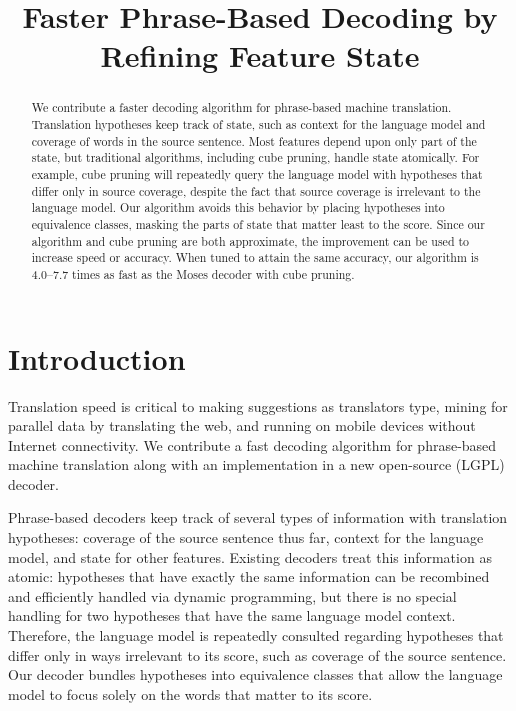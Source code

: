 \documentclass[11pt]{article}
\title{Faster Phrase-Based Decoding by Refining Feature State}
\author{}
\date{}
\begin{document}
\maketitle
\begin{abstract}
We contribute a faster decoding algorithm for phrase-based machine translation.  Translation hypotheses keep track of state, such as context for the language model and coverage of words in the source sentence.  Most features depend upon only part of the state, but traditional algorithms, including cube pruning, handle state atomically.  For example, cube pruning will repeatedly query the language model with hypotheses that differ only in source coverage, despite the fact that source coverage is irrelevant to the language model.  
Our algorithm avoids this behavior by placing hypotheses into equivalence classes, masking the parts of state that matter least to the score.  
Since our algorithm and cube pruning are both approximate, the improvement can be used to increase speed or accuracy.  
When tuned to attain the same accuracy, our algorithm is 4.0--7.7 times as fast as the Moses decoder with cube pruning.  
\end{abstract}

\section{Introduction}
\label{intro_label}
Translation speed is critical to making suggestions as translators type, mining for parallel data by translating the web, and running on mobile devices without Internet connectivity.  We contribute a fast decoding algorithm for phrase-based machine translation along with an implementation in a new open-source (LGPL) decoder.  

Phrase-based decoders \cite{moses,phrasal,jane-phrase} keep track of several types of information with translation hypotheses: coverage of the source sentence thus far, context for the language model, and state for other features.  Existing decoders treat this information as atomic: hypotheses that have exactly the same information can be recombined and efficiently handled via dynamic programming, but there is no special handling for two hypotheses that have the same language model context.  Therefore, the language model is repeatedly consulted regarding hypotheses that differ only in ways irrelevant to its score, such as coverage of the source sentence.  Our decoder bundles hypotheses into equivalence classes that allow the language model to focus solely on the words that matter to its score.  
\end{document}
